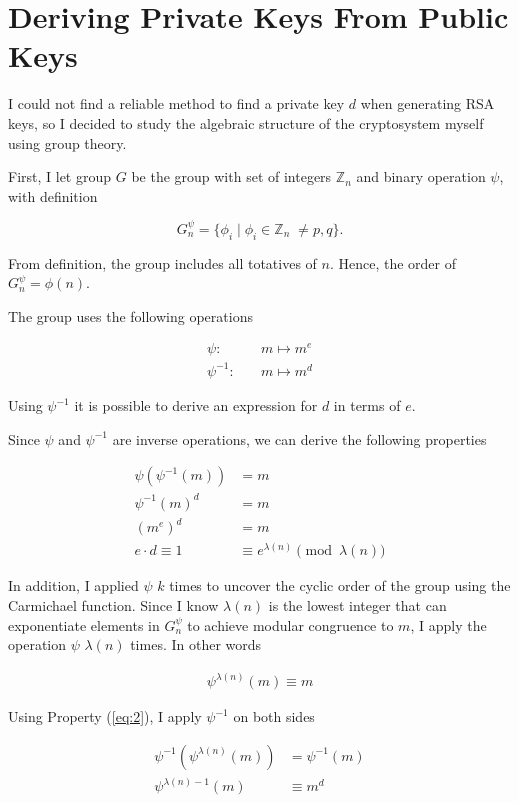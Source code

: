 \section{Deriving Private Keys From Public Keys}\label{sec:section4}

I could not find a reliable method to find a private key $d$ when generating RSA keys, so I decided to study the algebraic structure of the cryptosystem myself using group theory.

First, I let group $G$ be the group with set of integers $\mathbb{Z}_n$ and binary operation $\psi$, with definition

$$
G^{\psi}_{n} = \{  \phi_{i} \mid \phi_{i} \in \mathbb{Z}_{n} \; \neq p,q \}.
$$

From definition, the group includes all totatives of $n$. Hence, the order of $G^{\psi}_{n} = \phi (n)$.

The group uses the following operations

\begin{align*}
\psi : \quad &m \mapsto m^{e} \\
\psi^{-1} : \quad &m \mapsto m^{d} 
\end{align*}

Using $\psi^{-1}$ it is possible to derive an expression for $d$ in terms of $e$.

Since $\psi$ and $\psi^{-1}$ are inverse operations, we can derive the following properties

\begin{align*}
\psi (\psi^{-1}(m)) &= m \\
\psi^{-1} (m)^{d} &= m \\
(m^{e})^{d} &= m \\
e \cdot d \equiv 1 &\equiv e^{\lambda(n)}\pmod{\lambda(n)} \tag{1} \label{eq:1}
\end{align*}

In addition, I applied $\psi$ $k$ times to uncover the cyclic order of the group using the Carmichael function. Since I know $\lambda(n)$ is the lowest integer that can exponentiate elements in $G^{\psi}_{n}$ to achieve modular congruence to $m$, I apply the operation $\psi$ $\lambda(n)$ times. In other words

\begin{align*}
\psi^{\lambda(n)}(m) \equiv m \tag{2} \label{eq:2}
\end{align*}

Using Property (\ref{eq:2}), I apply $\psi^{-1}$ on both sides 

\begin{align*}
\psi^{-1} (\psi^{\lambda(n)}(m)) &= \psi^{-1}(m) \\
\psi^{\lambda(n)-1}(m) &\equiv m^{d} \tag{3} \label{eq:3}
\end{align*}

